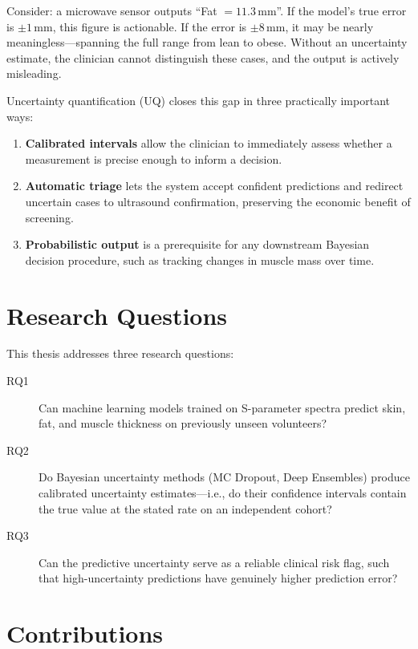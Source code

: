 \documentclass[12pt, a4paper, oneside]{report}
\begin{document}
Consider: a microwave sensor outputs ``Fat $= 11.3$\,mm''. If the model's true error is $\pm 1$\,mm, this figure is actionable. If the error is $\pm 8$\,mm, it may be nearly meaningless---spanning the full range from lean to obese. Without an uncertainty estimate, the clinician cannot distinguish these cases, and the output is actively misleading.

Uncertainty quantification (UQ) closes this gap in three practically important ways:
\begin{enumerate}[noitemsep]
  \item \textbf{Calibrated intervals} allow the clinician to immediately assess whether a measurement is precise enough to inform a decision.
  \item \textbf{Automatic triage} lets the system accept confident predictions and redirect uncertain cases to ultrasound confirmation, preserving the economic benefit of screening.
  \item \textbf{Probabilistic output} is a prerequisite for any downstream Bayesian decision procedure, such as tracking changes in muscle mass over time.
\end{enumerate}

\section{Research Questions}

This thesis addresses three research questions:

\begin{description}
  \item[RQ1] Can machine learning models trained on S-parameter spectra predict skin, fat, and muscle thickness on previously unseen volunteers?
  \item[RQ2] Do Bayesian uncertainty methods (MC Dropout, Deep Ensembles) produce calibrated uncertainty estimates---i.e., do their confidence intervals contain the true value at the stated rate on an independent cohort?
  \item[RQ3] Can the predictive uncertainty serve as a reliable clinical risk flag, such that high-uncertainty predictions have genuinely higher prediction error?
\end{description}

\section{Contributions}
\end{document}
